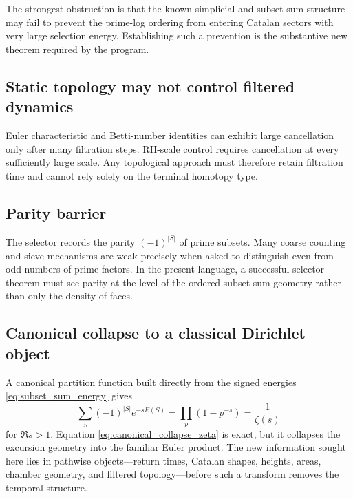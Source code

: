 \documentclass[11pt]{amsart}
\numberwithin{equation}{section}
\theoremstyle{plain}
\theoremstyle{definition}
\theoremstyle{remark}
\begin{document}
The strongest obstruction is that the known simplicial and subset-sum structure may fail to prevent the prime-log ordering from entering Catalan sectors with very large selection energy.  Establishing such a prevention is the substantive new theorem required by the program.

\subsection{Static topology may not control filtered dynamics}
\label{subsec:obstruction_static_dynamic}

Euler characteristic and Betti-number identities can exhibit large cancellation only after many filtration steps.  RH-scale control requires cancellation at every sufficiently large scale.  Any topological approach must therefore retain filtration time and cannot rely solely on the terminal homotopy type.

\subsection{Parity barrier}
\label{subsec:obstruction_parity}

The selector records the parity $(-1)^{|S|}$ of prime subsets.  Many coarse counting and sieve mechanisms are weak precisely when asked to distinguish even from odd numbers of prime factors.  In the present language, a successful selector theorem must see parity at the level of the ordered subset-sum geometry rather than only the density of faces.

\subsection{Canonical collapse to a classical Dirichlet object}
\label{subsec:obstruction_canonical_collapse}

A canonical partition function built directly from the signed energies \eqref{eq:subset_sum_energy} gives
\begin{equation}
\sum_{S}(-1)^{|S|}e^{-sE(S)}
=
\prod_p(1-p^{-s})
=
\frac{1}{\zeta(s)}
\label{eq:canonical_collapse_zeta}
\end{equation}
for $\Re s>1$.  Equation \eqref{eq:canonical_collapse_zeta} is exact, but it collapses the excursion geometry into the familiar Euler product.  The new information sought here lies in pathwise objects---return times, Catalan shapes, heights, areas, chamber geometry, and filtered topology---before such a transform removes the temporal structure.
\end{document}
